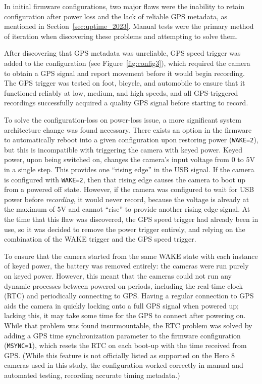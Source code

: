 \documentclass[
]{article}
\begin{document}
In initial firmware configurations, two major flaws were the inability
to retain configuration after power loss and the lack of reliable GPS
metadata, as mentioned in Section~\ref{sec:uptime_2023}. Manual tests
were the primary method of iteration when discovering these problems and
attempting to solve them.

After discovering that GPS metadata was unreliable, GPS speed trigger
was added to the configuration (see Figure~\ref{fig:config3}), which
required the camera to obtain a GPS signal and report movement before it
would begin recording. The GPS trigger was tested on foot, bicycle, and
automobile to ensure that it functioned reliably at low, medium, and
high speeds, and all GPS-triggered recordings successfully acquired a
quality GPS signal before starting to record.

To solve the configuration-loss on power-loss issue, a more significant
system architecture change was found necessary. There exists an option
in the firmware to automatically reboot into a given configuration upon
restoring power (\texttt{WAKE=2}), but this is incompatible with
triggering the camera with keyed power. Keyed power, upon being switched
on, changes the camera's input voltage from 0 to 5V in a single step.
This provides one ``rising edge'' in the USB signal. If the camera is
configured with \texttt{WAKE=2}, then that rising edge causes the camera
to boot up from a powered off state. However, if the camera was
configured to wait for USB power before \emph{recording}, it would never
record, because the voltage is already at the maximum of 5V and cannot
``rise'' to provide another rising edge signal. At the time that this
flaw was discovered, the GPS speed trigger had already been in use, so
it was decided to remove the power trigger entirely, and relying on the
combination of the WAKE trigger and the GPS speed trigger.

To ensure that the camera started from the same WAKE state with each
instance of keyed power, the battery was removed entirely: the cameras
were run purely on keyed power. However, this meant that the cameras
could not run any dynamic processes between powered-on periods,
including the real-time clock (RTC) and periodically connecting to GPS.
Having a regular connection to GPS aids the camera in quickly locking
onto a full GPS signal when powered up; lacking this, it may take some
time for the GPS to connect after powering on. While that problem was
found insurmountable, the RTC problem was solved by adding a GPS time
synchronization parameter to the firmware configuration
(\texttt{MSYNC=1}), which resets the RTC on each boot-up with the time
received from GPS. (While this feature is not officially listed as
supported on the Hero 8 cameras used in this study, the configuration
worked correctly in manual and automated testing, recording accurate
timing metadata.)
\end{document}
